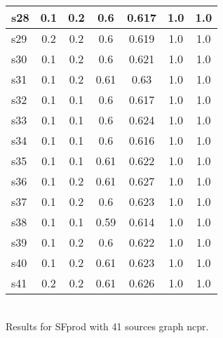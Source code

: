 \documentclass{article}
\begin{document}
\begin{tabular}{|l|c|c|c|c|c|c|}
\hline
s28 &0.1 & 0.2 & 0.6 & 0.617 & 1.0 & 1.0\\
\hline
s29 &0.2 & 0.2 & 0.6 & 0.619 & 1.0 & 1.0\\
\hline
s30 &0.1 & 0.2 & 0.6 & 0.621 & 1.0 & 1.0\\
\hline
s31 &0.1 & 0.2 & 0.61 & 0.63 & 1.0 & 1.0\\
\hline
s32 &0.1 & 0.1 & 0.6 & 0.617 & 1.0 & 1.0\\
\hline
s33 &0.1 & 0.1 & 0.6 & 0.624 & 1.0 & 1.0\\
\hline
s34 &0.1 & 0.1 & 0.6 & 0.616 & 1.0 & 1.0\\
\hline
s35 &0.1 & 0.1 & 0.61 & 0.622 & 1.0 & 1.0\\
\hline
s36 &0.1 & 0.2 & 0.61 & 0.627 & 1.0 & 1.0\\
\hline
s37 &0.1 & 0.2 & 0.6 & 0.623 & 1.0 & 1.0\\
\hline
s38 &0.1 & 0.1 & 0.59 & 0.614 & 1.0 & 1.0\\
\hline
s39 &0.1 & 0.2 & 0.6 & 0.622 & 1.0 & 1.0\\
\hline
s40 &0.1 & 0.2 & 0.61 & 0.623 & 1.0 & 1.0\\
\hline
s41 &0.2 & 0.2 & 0.61 & 0.626 & 1.0 & 1.0\\
\hline
\end{tabular}\\

\noindent Results for SFprod with 41 sources graph ncpr.
\end{document}
